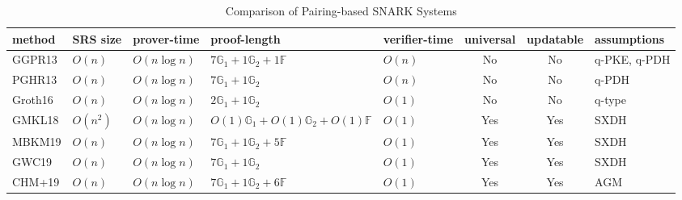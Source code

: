 \begin{table}[ht]
\caption{Comparison of Pairing-based SNARK Systems}
\begin{tabular}{|l|l|l|p{3.2cm}|l|c|c|l|}
\hline
\toprule
method & SRS size & prover-time & proof-length & verifier-time & universal & updatable & assumptions \\ \hline\toprule
\midrule
GGPR13 & $O(n)$ & $O(n \log n)$ & $7 \mathbb{G}_1 + 1 \mathbb{G}_2 + 1 \mathbb{F}$ & $O(n)$ & No & No & q-PKE, q-PDH \\ \hline
PGHR13 & $O(n)$ & $O(n \log n)$ & $7 \mathbb{G}_1 + 1 \mathbb{G}_2$ & $O(n)$ & No & No & q-PDH \\ \hline
Groth16 & $O(n)$ & $O(n \log n)$ & $2 \mathbb{G}_1 + 1 \mathbb{G}_2$ & $O(1)$ & No & No & q-type \\ \hline
GMKL18 & $O(n^2)$ & $O(n \log n)$ & $O(1) \mathbb{G}_1 + O(1) \mathbb{G}_2 + O(1) \mathbb{F}$ & $O(1)$ & Yes & Yes & SXDH \\ \hline
MBKM19 & $O(n)$ & $O(n \log n)$ & $7 \mathbb{G}_1 + 1 \mathbb{G}_2 + 5 \mathbb{F}$ & $O(1)$ & Yes & Yes & SXDH \\ \hline
GWC19 & $O(n)$ & $O(n \log n)$ & $7 \mathbb{G}_1 + 1 \mathbb{G}_2$ & $O(1)$ & Yes & Yes & SXDH \\ \hline
CHM+19 & $O(n)$ & $O(n \log n)$ & $7 \mathbb{G}_1 + 1 \mathbb{G}_2 + 6 \mathbb{F}$ & $O(1)$ & Yes & Yes & AGM \\ \hline\bottomrule
\bottomrule
\end{tabular}
\end{table}
